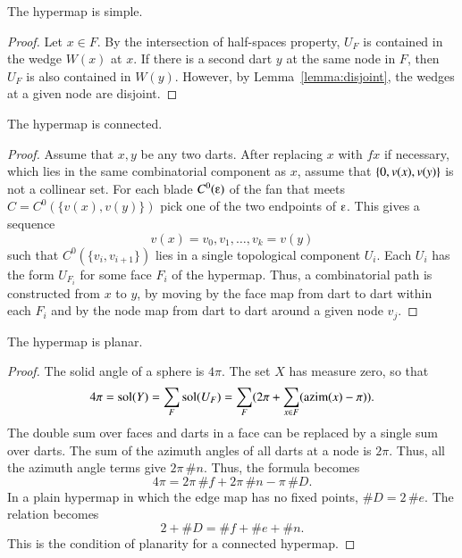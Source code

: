 \begin{corollary}  
The hypermap is simple.
\end{corollary}

\begin{proof}  Let $x\in F$.  By the intersection of half-spaces property, $U_F$ is contained in the wedge $W(x)$ at $x$.  If there is a second dart $y$ at the same node in $F$, then $U_F$ is also contained in $W(y)$. However, by Lemma~\ref{lemma:disjoint}, the wedges at a given node are disjoint.
\end{proof}

\begin{corollary}  
The hypermap is connected.
\end{corollary}

\begin{proof} Assume that $x,y$ be any two darts.  After replacing $x$ with $f x$ if necessary, which lies in the same combinatorial component as $x$, 
assume that $\{0,v(x),v(y)\}$ is not a collinear set. 
For each blade $C^0(\e)$ of the fan that meets $C=C^0(\{v(x),v(y)\})$
pick one of the two endpoints of $\e$.  This gives a sequence
$$
v(x)=v_0,v_1,\ldots,v_k=v(y)
$$
such that $C^0(\{v_i,v_{i+1}\})$ lies in a single topological component $U_i$.  Each $U_i$ has the form $U_{F_i}$ for some face $F_i$ of the hypermap.
Thus,  a combinatorial path is constructed from $x$ to $y$, by moving by the face map from dart to dart within each $F_i$ and by the node map from dart to dart around a given node $v_j$.
\end{proof}

\begin{corollary}  
The hypermap is planar.
\end{corollary}

\begin{proof}  The solid angle of a sphere is $4\pi$.  The set $X$
has measure zero, so that
$$
4\pi = \operatorname{sol}(Y)= \sum_F \operatorname{sol}(U_F) = 
\sum_F ( 2\pi + \sum_{x\in F} ({\operatorname{azim}}(x)-\pi) ).
$$
The double sum over faces and darts in a face can be replaced by
a single sum over darts.  
The sum of the azimuth angles of all darts at a node is $2\pi$. Thus,
all the azimuth angle terms give $2\pi\,\#n$.
Thus, the formula becomes
$$
4\pi = 2\pi\, \#f +2\pi\,\#n - \pi\, \#D.
$$
In a plain hypermap in which the edge map has no fixed points, $\#D = 2\,\#e$.
The relation becomes
$$
2 + \#D = \#f + \#e + \#n.
$$
This is the condition of planarity for a connected hypermap.
\end{proof}

